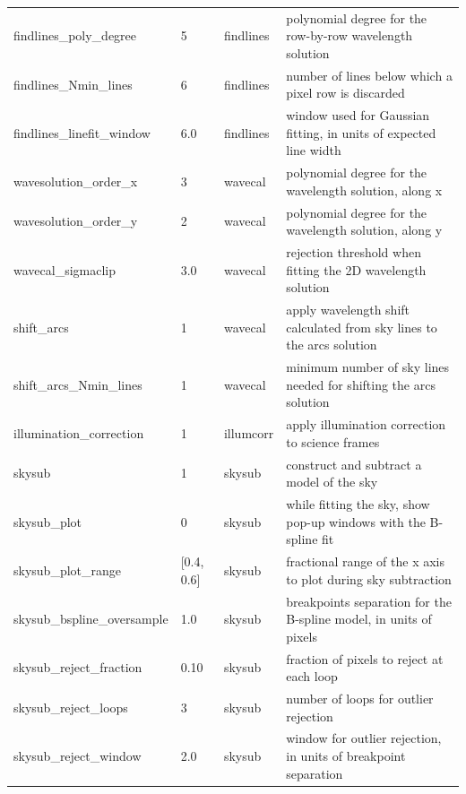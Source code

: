 \documentclass[a4paper]{article}
\begin{document}
\begin{sloppypar}
\begin{table}
{\begin{tabular}{llll}
    findlines\_poly\_degree       & 5             & findlines        & polynomial degree for the row-by-row wavelength solution \\
    findlines\_Nmin\_lines        & 6             & findlines        & number of lines below which a pixel row is discarded \\
    findlines\_linefit\_window    & 6.0           & findlines        & window used for Gaussian fitting, in units of expected line width \\
    wavesolution\_order\_x        & 3             & wavecal          & polynomial degree for the wavelength solution, along x \\
    wavesolution\_order\_y        & 2             & wavecal          & polynomial degree for the wavelength solution, along y \\
    wavecal\_sigmaclip            & 3.0           & wavecal          & rejection threshold when fitting the 2D wavelength solution \\
    shift\_arcs                   & 1             & wavecal          & apply wavelength shift calculated from sky lines to the arcs solution \\
    shift\_arcs\_Nmin\_lines      & 1             & wavecal          & minimum number of sky lines needed for shifting the arcs solution \\
    illumination\_correction      & 1             & illumcorr        & apply illumination correction to science frames \\
    skysub                        & 1             & skysub           & construct and subtract a model of the sky \\
    skysub\_plot                  & 0             & skysub           & while fitting the sky, show pop-up windows with the B-spline fit \\
    skysub\_plot\_range           & [0.4, 0.6]    & skysub           & fractional range of the x axis to plot during sky subtraction \\
    skysub\_bspline\_oversample   & 1.0           & skysub           & breakpoints separation for the B-spline model, in units of pixels \\
    skysub\_reject\_fraction      & 0.10          & skysub           & fraction of pixels to reject at each loop \\
    skysub\_reject\_loops         & 3             & skysub           & number of loops for outlier rejection \\
    skysub\_reject\_window        & 2.0           & skysub           & window for outlier rejection, in units of breakpoint separation \\

\end{tabular}}
\end{table}
\end{sloppypar}
\end{document}
